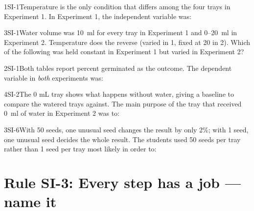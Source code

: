 \documentclass[11pt]{article}
\begin{document}
\begin{q}{1}{SI-1}{Temperature is the only condition that differs among the four trays in Experiment 1.}
In Experiment 1, the independent variable was:
\end{q}

\begin{q}{3}{SI-1}{Water volume was \SI{10}{\milli\litre} for every tray in Experiment 1 and 0--\SI{20}{\milli\litre} in Experiment 2. Temperature does the reverse (varied in 1, fixed at 20 in 2).}
Which of the following was held constant in Experiment 1 but varied in Experiment 2?
\end{q}

\begin{q}{2}{SI-1}{Both tables report percent germinated as the outcome.}
The dependent variable in \emph{both} experiments was:
\end{q}

\begin{q}{4}{SI-2}{The 0 mL tray shows what happens without water, giving a baseline to compare the watered trays against.}
The main purpose of the tray that received \SI{0}{\milli\litre} of water in Experiment 2 was to:
\end{q}

\begin{q}{3}{SI-6}{With 50 seeds, one unusual seed changes the result by only 2\%; with 1 seed, one unusual seed decides the whole result.}
The students used 50 seeds per tray rather than 1 seed per tray most likely in order to:
\end{q}

\section{Rule SI-3: Every step has a job --- name it}
\end{document}
